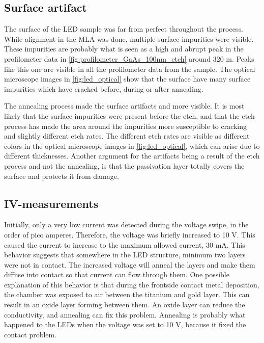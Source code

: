 



\subsection{Surface artifact}
\label{sec:discussion:surface_artifact}

The surface of the LED sample was far from perfect throughout the process.
While alignment in the MLA was done, multiple surface impurities were visible. 
These impurities are probably what is seen as a high and abrupt peak in the profilometer data in \autoref{fig:profilometer_GaAs_100nm_etch} around 320 \textmu m.
Peaks like this one are visible in all the profilometer data from the sample. 
The optical microscope images in \autoref{fig:led_optical} show that the surface have many surface impurities which have cracked before, during or after annealing. 


The annealing process made the surface artifacts and more visible.
It is most likely that the surface impurities were present before the etch, and that the etch process has made the area around the impurities more susceptible to cracking and slightly different etch rates.
The different etch rates are visible as different colors in the optical microscope images in \autoref{fig:led_optical}, which can arise due to different thicknesses. 
Another argument for the artifacts being a result of the etch process and not the annealing, is that the passivation layer totally covers the surface and protects it from damage. 

\subsection{IV-measurements}

Initially, only a very low current was detected during the voltage swipe, in the order of pico amperes.
Therefore, the voltage was briefly increased to 10 V.
This caused the current to increase to the maximum allowed current, 30 mA.
This behavior suggests that somewhere in the LED structure, minimum two layers were not in contact.
The increased voltage will anneal the layers and make them diffuse into contact so that current can flow through them.
One possible explanation of this behavior is that during the frontside contact metal deposition, the chamber was exposed to air between the titanium and gold layer.
This can result in an oxide layer forming between them.
An oxide layer can reduce the conductivity, and annealing can fix this problem. 
Annealing is probably what happened to the LEDs when the voltage was set to 10 V, because it fixed the contact problem.

